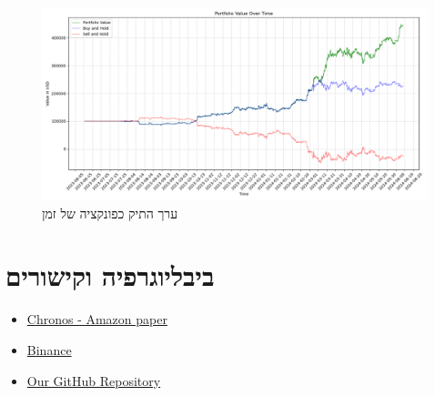 \documentclass[a4paper,11pt]{article}
\newcommand{\te}[1]{\textenglish{#1}}
\begin{document}
\begin{RTL}
\begin{figure}[H]
    \centering
    \includegraphics[width=1\textwidth]{backtesting1.png}
    \caption{ערך התיק כפונקציה של זמן}
\end{figure}
\section{ביבליוגרפיה וקישורים}
\begin{itemize}
    \item \href{https://github.com/amazon-science/chronos-forecasting?tab=readme-ov-file}{\te{Chronos - Amazon paper}}
    \item \href{https://www.binance.com/en}{\te{Binance}}
    \item \href{https://github.com/GabrielMagidov/Algotrading}{\te{Our GitHub Repository}}
\end{itemize}
\end{RTL}
\end{document}
